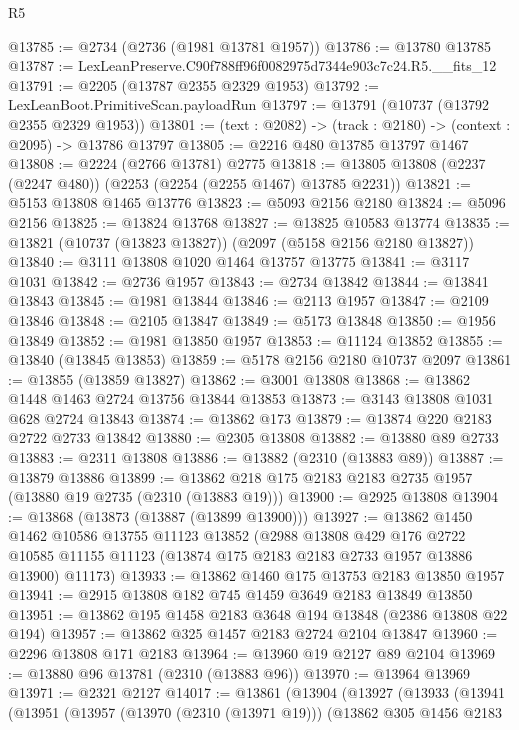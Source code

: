 \begin{lexlean}{R5}
\begin{coremodule}
@13785 := @2734 (@2736 (@1981 @13781 @1957))
@13786 := @13780 @13785
@13787 := LexLeanPreserve.C90f788ff96f0082975d7344e903c7c24.R5.__fits_12
@13791 := @2205 (@13787 @2355 @2329 @1953)
@13792 := LexLeanBoot.PrimitiveScan.payloadRun
@13797 := @13791 (@10737 (@13792 @2355 @2329 @1953))
@13801 := (text : @2082) -> (track : @2180) -> (context : @2095) -> @13786 @13797
@13805 := @2216 @480 @13785 @13797 @1467
@13808 := @2224 (@2766 @13781) @2775
@13818 := @13805 @13808 (@2237 (@2247 @480)) (@2253 (@2254 (@2255 @1467) @13785 @2231))
@13821 := @5153 @13808 @1465 @13776
@13823 := @5093 @2156 @2180
@13824 := @5096 @2156
@13825 := @13824 @13768
@13827 := @13825 @10583 @13774
@13835 := @13821 (@10737 (@13823 @13827)) (@2097 (@5158 @2156 @2180 @13827))
@13840 := @3111 @13808 @1020 @1464 @13757 @13775
@13841 := @3117 @1031
@13842 := @2736 @1957
@13843 := @2734 @13842
@13844 := @13841 @13843
@13845 := @1981 @13844
@13846 := @2113 @1957
@13847 := @2109 @13846
@13848 := @2105 @13847
@13849 := @5173 @13848
@13850 := @1956 @13849
@13852 := @1981 @13850 @1957
@13853 := @11124 @13852
@13855 := @13840 (@13845 @13853)
@13859 := @5178 @2156 @2180 @10737 @2097
@13861 := @13855 (@13859 @13827)
@13862 := @3001 @13808
@13868 := @13862 @1448 @1463 @2724 @13756 @13844 @13853
@13873 := @3143 @13808 @1031 @628 @2724 @13843
@13874 := @13862 @173
@13879 := @13874 @220 @2183 @2722 @2733 @13842
@13880 := @2305 @13808
@13882 := @13880 @89 @2733
@13883 := @2311 @13808
@13886 := @13882 (@2310 (@13883 @89))
@13887 := @13879 @13886
@13899 := @13862 @218 @175 @2183 @2183 @2735 @1957 (@13880 @19 @2735 (@2310 (@13883 @19)))
@13900 := @2925 @13808
@13904 := @13868 (@13873 (@13887 (@13899 @13900)))
@13927 := @13862
    @1450
    @1462
    @10586
    @13755
    @11123
    @13852
    (@2988
      @13808
      @429
      @176
      @2722
      @10585
      @11155
      @11123
      (@13874 @175 @2183 @2183 @2733 @1957 @13886 @13900)
      @11173)
@13933 := @13862 @1460 @175 @13753 @2183 @13850 @1957
@13941 := @2915 @13808 @182 @745 @1459 @3649 @2183 @13849 @13850
@13951 := @13862 @195 @1458 @2183 @3648 @194 @13848 (@2386 @13808 @22 @194)
@13957 := @13862 @325 @1457 @2183 @2724 @2104 @13847
@13960 := @2296 @13808 @171 @2183
@13964 := @13960 @19 @2127 @89 @2104
@13969 := @13880 @96 @13781 (@2310 (@13883 @96))
@13970 := @13964 @13969
@13971 := @2321 @2127
@14017 := @13861
    (@13904
      (@13927
        (@13933
          (@13941
            (@13951
              (@13957
                (@13970 (@2310 (@13971 @19)))
                (@13862
                  @305
                  @1456
                  @2183

\end{coremodule}
\end{lexlean}
